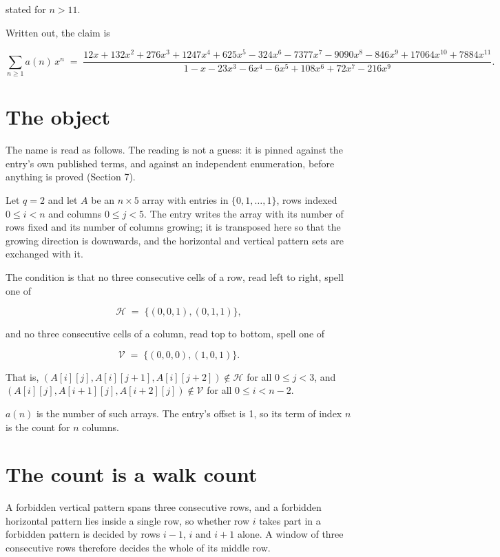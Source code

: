 \documentclass[11pt]{article}
\theoremstyle{definition}
\begin{document}
stated for $n > 11$.

Written out, the claim is

\[\sum_{n \ge 1} a(n)\,x^n \;=\; \frac{12x + 132x^{2} + 276x^{3} + 1247x^{4} + 625x^{5} - 324x^{6} - 7377x^{7} - 9090x^{8} - 846x^{9} + 17064x^{10} + 7884x^{11}}{1 - x - 23x^{3} - 6x^{4} - 6x^{5} + 108x^{6} + 72x^{7} - 216x^{9}}.\]

\section{The object}

The name is read as follows. The reading is not a guess: it is pinned against the entry's own published terms, and against an independent enumeration, before anything is proved (Section 7).

Let $q = 2$ and let $A$ be an $n \times 5$ array with entries in $\{0,1,\dots,1\}$, rows indexed $0 \le i < n$ and columns $0 \le j < 5$. The entry writes the array with its number of rows fixed and its number of columns growing; it is transposed here so that the growing direction is downwards, and the horizontal and vertical pattern sets are exchanged with it.

The condition is that no three consecutive cells of a row, read left to right, spell one of

\[\mathcal{H} \;=\; \{(0,0,1), (0,1,1)\},\]

and no three consecutive cells of a column, read top to bottom, spell one of

\[\mathcal{V} \;=\; \{(0,0,0), (1,0,1)\}.\]

That is, $(A[i][j],A[i][j{+}1],A[i][j{+}2]) \notin \mathcal{H}$ for all $0 \le j < 3$, and $(A[i][j],A[i{+}1][j],A[i{+}2][j]) \notin \mathcal{V}$ for all $0 \le i < n-2$.

$a(n)$ is the number of such arrays. The entry's offset is 1, so its term of index $n$ is the count for $n$ columns.

\section{The count is a walk count}

A forbidden vertical pattern spans three consecutive rows, and a forbidden horizontal pattern lies inside a single row, so whether row $i$ takes part in a forbidden pattern is decided by rows $i-1$, $i$ and $i+1$ alone. A window of three consecutive rows therefore decides the whole of its middle row.
\end{document}
